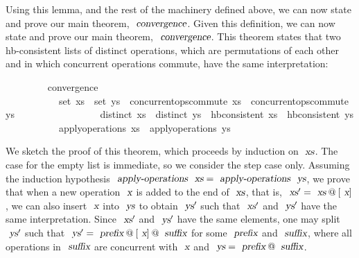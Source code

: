 Using this lemma, and the rest of the machinery defined above, we can now state and prove our main theorem, $\isa{convergence}$.
\else
Given this definition, we can now state and prove our main theorem, $\isa{convergence}$.
\fi
This theorem states that two hb-consistent lists of distinct operations, which are permutations of each other and in which concurrent operations commute, have the same interpretation:
\vspace{0.375em}
\begin{isabellebody}
\ \ \ \ \ \ \ \  convergence{\isacharcolon}\isanewline
\ \ \ \ \ \ \ \ \ \ \ {\isachardoublequoteopen}set\ xs\ {\isacharequal}\ set\ ys{\isachardoublequoteclose}\ \ {\isachardoublequoteopen}concurrent{\isacharunderscore}ops{\isacharunderscore}commute\ xs{\isachardoublequoteclose}\ \ {\isachardoublequoteopen}concurrent{\isacharunderscore}ops{\isacharunderscore}commute\ ys{\isachardoublequoteclose}\isanewline
\ \ \ \ \ \ \ \ \ \ \ \ \ \ \ \ \ {\isachardoublequoteopen}distinct\ xs{\isachardoublequoteclose}\ \ {\isachardoublequoteopen}distinct\ ys{\isachardoublequoteclose}\ \ {\isachardoublequoteopen}hb{\isacharunderscore}consistent\ xs{\isachardoublequoteclose}\ \ {\isachardoublequoteopen}hb{\isacharunderscore}consistent\ ys{\isachardoublequoteclose}\isanewline
\ \ \ \ \ \ \ \ \ \ \ {\isachardoublequoteopen}apply{\isacharunderscore}operations\ xs\ {\isacharequal}\ apply{\isacharunderscore}operations\ ys{\isachardoublequoteclose}
\end{isabellebody}
\vspace{0.375em}
\ifextended
We sketch the proof of this theorem, which proceeds by induction on $\isa{xs}$.
The case for the empty list is immediate, so we consider the step case only.
Assuming the induction hypothesis $\isa{apply-operations}\ \isa{xs} = \isa{apply-operations}\ \isa{ys}$, we prove that when a new operation $\isa{x}$ is added to the end of $\isa{xs}$, that is, $\isa{xs}' = \isa{xs}\mathbin{@}[\isa{x}]$, we can also insert $\isa{x}$ into $\isa{ys}$ to obtain $\isa{ys}'$ such that $\isa{xs}'$ and $\isa{ys}'$ have the same interpretation.
Since $\isa{xs}'$ and $\isa{ys}'$ have the same elements, one may split $\isa{ys}'$ such that $\isa{ys}' = \isa{prefix}\mathbin{@}[\isa{x}]\mathbin{@}\isa{suffix}$ for some $\isa{prefix}$ and $\isa{suffix}$, where all operations in $\isa{suffix}$ are concurrent with $\isa{x}$ and $\isa{ys} = \isa{prefix}\mathbin{@}\isa{suffix}$.
